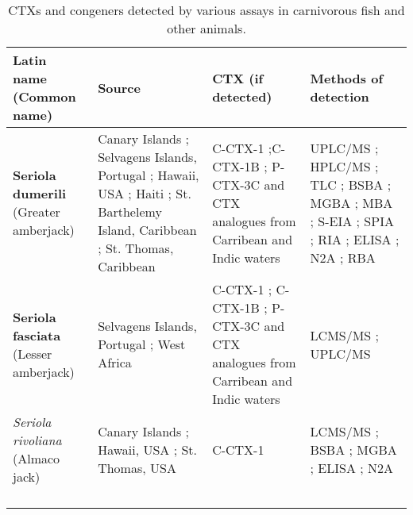 \documentclass[12pt]{article}
\begin{document}
\begin{landscape}
\begin{longtable}{ |  p{4.5cm} | p{5cm} | p{4.5cm} | p{5cm} | }
\caption{CTXs and congeners detected by various assays in carnivorous fish and other animals.}\\
\hline
\textbf{Latin name (Common name)} & \textbf{Source} & \textbf{CTX (if detected)} & \textbf{Methods of detection} \\
\hline
 \textbf{Seriola dumerili} (Greater amberjack) & Canary Islands \cite{caillaud2012towards}; Selvagens Islands, Portugal \cite{otero2010first}; Hawaii, USA \cite{campora2008detection,hokama1977radioimmunoassay,hokama1983rapid,hokama1985rapid}; Haiti \cite{poli1997identification}; St. Barthelemy Island, Caribbean \cite{vernoux1986heterogeneity}; St. Thomas, Caribbean \cite{granade1976ciguatera} & C-CTX-1 \cite{poli1997identification};C-CTX-1B \cite{otero2010first}; P-CTX-3C and CTX analogues from Carribean and Indic waters \cite{otero2010first} & UPLC/MS \cite{otero2010first}; HPLC/MS \cite{poli1997identification}; TLC \cite{vernoux1986heterogeneity}; BSBA \cite{granade1976ciguatera}; MGBA \cite{campora2008detection,granade1976ciguatera}; MBA \cite{hokama1983rapid,hokama1985rapid,vernoux1986heterogeneity}; S-EIA \cite{hokama1985rapid}; SPIA \cite{otero2010first}; RIA \cite{campora2008detection,hokama1983rapid}; ELISA \cite{campora2008detection}; N2A \cite{caillaud2012towards,campora2008detection}; RBA \cite{} \\
\hline
 \textbf{Seriola fasciata} (Lesser amberjack) & Selvagens Islands, Portugal \cite{otero2010first}; West Africa \cite{boada2010ciguatera} & C-CTX-1 \cite{boada2010ciguatera}; C-CTX-1B \cite{otero2010first}; P-CTX-3C and CTX analogues from Carribean and Indic waters \cite{otero2010first} & LCMS/MS \cite{boada2010ciguatera}; UPLC/MS \cite{otero2010first}\\
\hline
 \emph{Seriola rivoliana} (Almaco jack) & Canary Islands \cite{campora2010evaluating}; Hawaii, USA \cite{campora2008detection}; St. Thomas, USA \cite{granade1976ciguatera} & C-CTX-1 \cite{} & LCMS/MS \cite{}; BSBA \cite{granade1976ciguatera}; MGBA \cite{granade1976ciguatera}; ELISA \cite{campora2008detection,campora2010evaluating}; N2A \cite{campora2008detection,campora2010evaluating} \\
\hline
  &  &  & \\
\hline
  &  &  & \\
\hline
  &  &  & \\
\hline
  &  &  & \\

\end{longtable}
\end{landscape}
\end{document}

